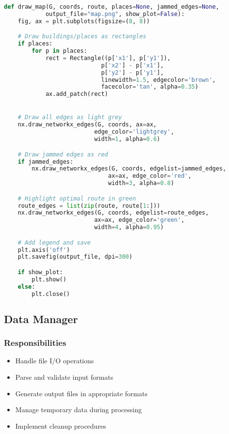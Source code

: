 \documentclass[conference]{IEEEtran}
\begin{document}
\begin{lstlisting}[language=Python, caption=Network Visualization Function]
def draw_map(G, coords, route, places=None, jammed_edges=None,
            output_file="map.png", show_plot=False):
    fig, ax = plt.subplots(figsize=(8, 8))

    # Draw buildings/places as rectangles
    if places:
        for p in places:
            rect = Rectangle((p['x1'], p['y1']),
                            p['x2'] - p['x1'],
                            p['y2'] - p['y1'],
                            linewidth=1.5, edgecolor='brown',
                            facecolor='tan', alpha=0.35)
            ax.add_patch(rect)


    # Draw all edges as light grey
    nx.draw_networkx_edges(G, coords, ax=ax,
                          edge_color='lightgrey',
                          width=1, alpha=0.6)

    # Draw jammed edges as red
    if jammed_edges:
        nx.draw_networkx_edges(G, coords, edgelist=jammed_edges,
                              ax=ax, edge_color='red',
                              width=3, alpha=0.8)

    # Highlight optimal route in green
    route_edges = list(zip(route, route[1:]))
    nx.draw_networkx_edges(G, coords, edgelist=route_edges,
                          ax=ax, edge_color='green',
                          width=4, alpha=0.95)

    # Add legend and save
    plt.axis('off')
    plt.savefig(output_file, dpi=300)

    if show_plot:
        plt.show()
    else:
        plt.close()
\end{lstlisting}

\subsection{Data Manager}

\subsubsection{Responsibilities}
\begin{itemize}
    \item Handle file I/O operations
    \item Parse and validate input formats
    \item Generate output files in appropriate formats
    \item Manage temporary data during processing
    \item Implement cleanup procedures
\end{itemize}
\end{document}
